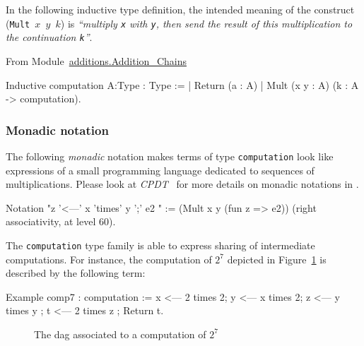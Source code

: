   In the following inductive type definition, the intended meaning 
  of the construct (\texttt{Mult $x$ $y$ $k$})  is \emph{``multiply \texttt{x} with
\texttt{y}, then send  the result of this multiplication to 
  the continuation  \texttt{k}''}.



From Module~\href{../theories/html/additions.Addition_Chains.html}{additions.Addition\_Chains}

\begin{Coqsrc}
Inductive computation {A:Type}  : Type :=
| Return (a : A)
| Mult (x y : A) (k : A -> computation).    
\end{Coqsrc}
\subsubsection{Monadic notation}


The following \emph{monadic} 
notation makes terms of type \texttt{computation} look like
expressions of a small programming language dedicated to sequences of multiplications.
Please look at \emph{CPDT}~\cite{chlipalacpdt2011} for more details on monadic notations in \coq.
\label{monadic-mult}

\begin{Coqsrc}
Notation "z '<---'  x 'times' y ';' e2 " :=
  (Mult x y  (fun z => e2))
    (right associativity, at level 60).
\end{Coqsrc}

The \texttt{computation} type family is able to express sharing of intermediate computations. For instance, the computation of $2^7$ depicted in Figure~\ref{fig:dag7} is described by  the following term:

\begin{Coqsrc}
Example comp7 : computation  :=
  x <--- 2 times 2;
  y <--- x times 2;
  z <--- y times y ;
  t <--- 2 times z ;
  Return t.  
\end{Coqsrc}

\begin{figure}[h]
  \centering
  \caption{The dag associated to a computation of $2^7$}
  \label{fig:dag7}
\end{figure}


